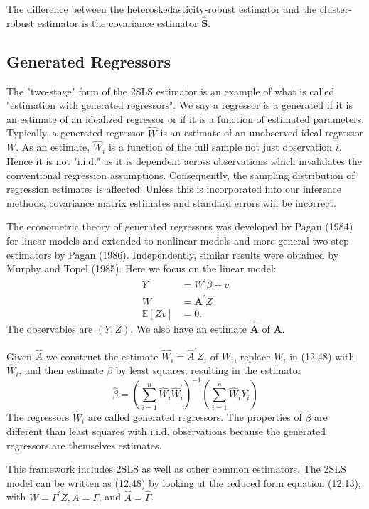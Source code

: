 \documentclass[10pt]{article}
\begin{document}
The difference between the heteroskedasticity-robust estimator and the cluster-robust estimator is the covariance estimator $\widehat{\boldsymbol{S}}$.

\subsection{Generated Regressors}
The "two-stage" form of the 2SLS estimator is an example of what is called "estimation with generated regressors". We say a regressor is a generated if it is an estimate of an idealized regressor or if it is a function of estimated parameters. Typically, a generated regressor $\widehat{W}$ is an estimate of an unobserved ideal regressor $W$. As an estimate, $\widehat{W}_{i}$ is a function of the full sample not just observation $i$. Hence it is not "i.i.d." as it is dependent across observations which invalidates the conventional regression assumptions. Consequently, the sampling distribution of regression estimates is affected. Unless this is incorporated into our inference methods, covariance matrix estimates and standard errors will be incorrect.

The econometric theory of generated regressors was developed by Pagan (1984) for linear models and extended to nonlinear models and more general two-step estimators by Pagan (1986). Independently, similar results were obtained by Murphy and Topel (1985). Here we focus on the linear model:
$$
\begin{aligned}
Y &=W^{\prime} \beta+v \\
W &=\boldsymbol{A}^{\prime} Z \\
\mathbb{E}[Z v] &=0 .
\end{aligned}
$$
The observables are $(Y, Z)$. We also have an estimate $\widehat{\boldsymbol{A}}$ of $\boldsymbol{A}$.

Given $\widehat{A}$ we construct the estimate $\widehat{W}_{i}=\widehat{A}^{\prime} Z_{i}$ of $W_{i}$, replace $W_{i}$ in (12.48) with $\widehat{W}_{i}$, and then estimate $\beta$ by least squares, resulting in the estimator
$$
\widehat{\beta}=\left(\sum_{i=1}^{n} \widehat{W}_{i} \widehat{W}_{i}^{\prime}\right)^{-1}\left(\sum_{i=1}^{n} \widehat{W}_{i} Y_{i}\right)
$$
The regressors $\widehat{W}_{i}$ are called generated regressors. The properties of $\widehat{\beta}$ are different than least squares with i.i.d. observations because the generated regressors are themselves estimates.

This framework includes 2SLS as well as other common estimators. The 2SLS model can be written as (12.48) by looking at the reduced form equation (12.13), with $W=\Gamma^{\prime} Z, A=\Gamma$, and $\widehat{A}=\widehat{\Gamma}$.
\end{document}
